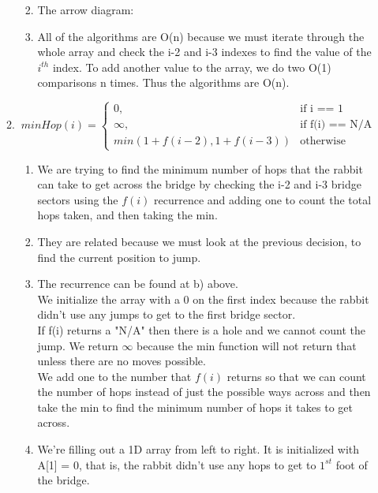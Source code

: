 \documentclass[11pt]{article}
\begin{document}
\begin{enumerate}
\begin{enumerate}
\begin{enumerate}
\vspace*{3cm}

\item
The arrow diagram:

\vspace*{3cm}

\item
All of the algorithms are O(n) because we must iterate through the whole array and check the i-2 and i-3 indexes to find the value of the $i^{th}$ index. To add another value to the array, we do two O(1) comparisons n times. Thus the algorithms are O(n).
\end{enumerate}

\item
\begin{equation}
minHop (i)=\begin{cases}
0, & \text{if i == 1}\\
\infty, & \text{if f(i) == N/A}\\
min (1 + f(i-2), 1 +f(i-3)) & \text{otherwise}
\end{cases}
\end{equation}
\begin{enumerate}
\item
We are trying to find the minimum number of hops that the rabbit can take to get across the bridge by checking the i-2 and i-3 bridge sectors using the $f(i)$ recurrence and adding one to count the total hops taken, and then taking the min. 
\item
They are related because we must look at the previous decision, to find the current position to jump.
\item
The recurrence can be found at b) above.\\
We initialize the array with a 0 on the first index because the rabbit didn't use any jumps to get to the first bridge sector.\\
If f(i) returns a "N/A" then there is a hole and we cannot count the jump. We return $\infty$ because the min function will not return that unless there are no moves possible.\\
We add one to the number that $f(i)$ returns so that we can count the number of hops instead of just the possible ways across and then take the min to find the minimum number of hops it takes to get across.

\item
We're filling out a 1D array from left to right. It is initialized with A[1] = 0, that is, the rabbit didn't use any hops to get to $1^{st}$ foot of the bridge.



\end{enumerate}
\end{enumerate}
\end{enumerate}
\end{document}
